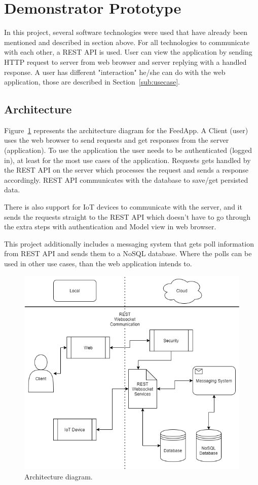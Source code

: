 \section{Demonstrator Prototype}
\label{sec:design}

In this project, several software technologies were used that have already been mentioned and described in section above. For all technologies to communicate with each other, a REST API is used. User can view the application by sending HTTP request to server from web browser and server replying with a handled response. A user has different "interaction" he/she can do with the web application, those are described in Section~\ref{sub:usecase}.

\subsection{Architecture}
\label{sub:architeure}
Figure~\ref{fig:archdiagram} represents the architecture diagram for the FeedApp.
A Client (user) uses the web browser to send requests and get responses from the server (application). To use the application the user needs to be authenticated (logged in), at least for the most use cases of the application. Requests gets handled by the REST API on the server which processes the request and sends a response accordingly. REST API communicates with the database to save/get persisted data.

There is also support for IoT devices to communicate with the server, and it sends the requests straight to the REST API which doesn't have to go through the extra steps with authentication and Model view in web browser.

This project additionally includes a messaging system that gets poll information from REST API and sends them to a NoSQL database. Where the polls can be used in other use cases, than the web application intends to.
\begin{figure}[H]
  \centering
  \includegraphics[scale=0.5]{figs/archdiagram.png}
  \caption[scale=0.5]{Architecture diagram.}
  \label{fig:archdiagram}
\end{figure}

